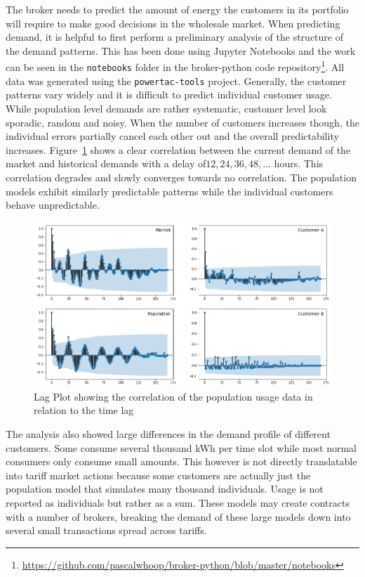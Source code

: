 The broker needs to predict the amount of energy the customers in its portfolio will require to make good decisions in
the wholesale market.
When predicting demand, it is helpful to first perform a preliminary analysis of the structure of the demand patterns.
This has been done using Jupyter Notebooks and the work can be seen in the \texttt{notebooks} folder in the
broker-python code repository\footnote{\url{https://github.com/pascalwhoop/broker-python/blob/master/notebooks}}. All data was generated using the
\texttt{powertac-tools} project. Generally, the customer patterns vary widely and it is difficult to predict individual
customer usage. While population level demands are rather systematic, customer level look sporadic, random and noisy.
When the number of customers increases though, the individual errors partially cancel each other out and the overall
predictability increases.  Figure~\ref{fig:demandtimelag} shows a clear correlation between the current demand of the
market and historical demands with a delay of$12,24,36,48,\ldots$ hours. This correlation degrades and slowly
converges towards no correlation. The population models exhibit similarly predictable patterns while the individual
customers behave unpredictable. 

\begin{figure}[h]
    \centering
    \includegraphics[width=1.0\linewidth]{img/demand_7.png}
    \caption{Lag Plot showing the correlation of the population usage data in relation to the time lag}
    \label{fig:demandtimelag}
\end{figure}

The analysis also showed large differences in the demand profile of different customers. Some consume several thousand
\ac{kWh} per time slot while most normal consumers only consume small amounts. This however is not directly
translatable into tariff market actions because some customers are actually just the population model that simulates many
thousand individuals. Usage is not reported as individuals but rather as a sum. These models may create contracts with a
number of brokers, breaking the demand of these large models down into several small transactions spread across tariffs.

